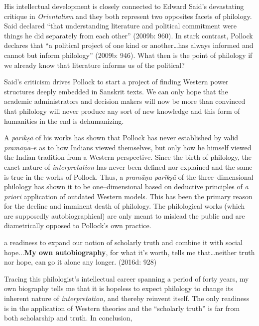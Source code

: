 His intellectual development is closely connected to Edward Said’s devastating critique in \textit{Orientalism} and they both represent two opposites facets of philology. Said declared “that understanding literature and political commitment were things he did separately from each other” (2009b: 960). In stark contrast, Pollock declares that “a political project of one kind or another…has always informed and cannot but inform philology” (2009b: 946). What then is the point of philology if we already know that literature informs us of the political?

Said’s criticism drives Pollock to start a project of finding Western power structures deeply embedded in Sanskrit texts. We can only hope that the academic administrators and decision makers will now be more than convinced that philology will never produce any sort of new knowledge and this form of humanities in the end is dehumanizing.

A \textit{parīkṣā} of his works has shown that Pollock has never established by valid \textit{pramāṇa}–s as to how Indians viewed themselves, but only how he himself viewed the Indian tradition from a Western perspective. Since the birth of philology, the exact nature of \textit{interpretation} has never been defined nor explained and the same is true in the works of Pollock. Thus, a \textit{pramāṇa parīkṣā} of the three–dimensional philology has shown it to be one–dimensional based on deductive principles of \textit{a priori} application of outdated Western models. This has been the primary reason for the decline and imminent death of philology. The philological works (which are supposedly autobiographical) are only meant to mislead the public and are diametrically opposed to Pollock’s own practice.

\begin{myquote}
a readiness to expand our notion of scholarly truth and combine it with social hope...\textbf{My own autobiography}, for what it’s worth, tells me that…neither truth nor hope, can go it alone any longer. (2016d: 928)
\end{myquote}

\newpage

Tracing this philologist’s intellectual career spanning a period of forty years, my own biography tells me that it is hopeless to expect philology to change its inherent nature of \textit{interpretation,} and thereby reinvent itself. The only readiness is in the application of Western theories and the “scholarly truth” is far from both scholarship and truth. In conclusion,

